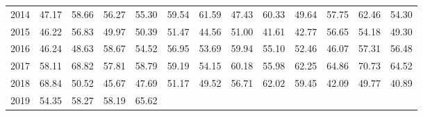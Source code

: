 \begin{longtable}{rrrrrrrrrrrrr}
  2014 & 47.17 & 58.66 & 56.27 & 55.30 & 59.54 & 61.59 & 47.43 & 60.33 & 49.64 & 57.75 & 62.46 & 54.30 \\ 
  2015 & 46.22 & 56.83 & 49.97 & 50.39 & 51.47 & 44.56 & 51.00 & 41.61 & 42.77 & 56.65 & 54.18 & 49.30 \\ 
  2016 & 46.24 & 48.63 & 58.67 & 54.52 & 56.95 & 53.69 & 59.94 & 55.10 & 52.46 & 46.07 & 57.31 & 56.48 \\ 
  2017 & 58.11 & 68.82 & 57.81 & 58.79 & 59.19 & 54.15 & 60.18 & 55.98 & 62.25 & 64.86 & 70.73 & 64.52 \\ 
  2018 & 68.84 & 50.52 & 45.67 & 47.69 & 51.17 & 49.52 & 56.71 & 62.02 & 59.45 & 42.09 & 49.77 & 40.89 \\ 
  2019 & 54.35 & 58.27 & 58.19 & 65.62 &  &  &  &  &  &  &  &  \\ 
   \hline
\hline
\end{longtable}

